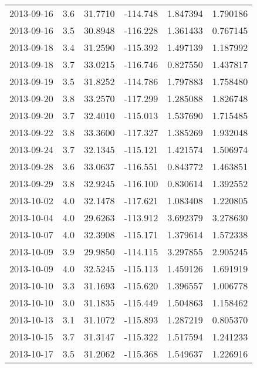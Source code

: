 \begin{tabular}{lrrrrr}
2013-09-16 &       3.6 &  31.7710 &  -114.748 &         1.847394 &         1.790186 \\
2013-09-16 &       3.5 &  30.8948 &  -116.228 &         1.361433 &         0.767145 \\
2013-09-18 &       3.4 &  31.2590 &  -115.392 &         1.497139 &         1.187992 \\
2013-09-18 &       3.7 &  33.0215 &  -116.746 &         0.827550 &         1.437817 \\
2013-09-19 &       3.5 &  31.8252 &  -114.786 &         1.797883 &         1.758480 \\
2013-09-20 &       3.8 &  33.2570 &  -117.299 &         1.285088 &         1.826748 \\
2013-09-20 &       3.7 &  32.4010 &  -115.013 &         1.537690 &         1.715485 \\
2013-09-22 &       3.8 &  33.3600 &  -117.327 &         1.385269 &         1.932048 \\
2013-09-24 &       3.7 &  32.1345 &  -115.121 &         1.421574 &         1.506974 \\
2013-09-28 &       3.6 &  33.0637 &  -116.551 &         0.843772 &         1.463851 \\
2013-09-29 &       3.8 &  32.9245 &  -116.100 &         0.830614 &         1.392552 \\
2013-10-02 &       4.0 &  32.1478 &  -117.621 &         1.083408 &         1.220805 \\
2013-10-04 &       4.0 &  29.6263 &  -113.912 &         3.692379 &         3.278630 \\
2013-10-07 &       4.0 &  32.3908 &  -115.171 &         1.379614 &         1.572338 \\
2013-10-09 &       3.9 &  29.9850 &  -114.115 &         3.297855 &         2.905245 \\
2013-10-09 &       4.0 &  32.5245 &  -115.113 &         1.459126 &         1.691919 \\
2013-10-10 &       3.3 &  31.1693 &  -115.620 &         1.396557 &         1.006778 \\
2013-10-10 &       3.0 &  31.1835 &  -115.449 &         1.504863 &         1.158462 \\
2013-10-13 &       3.1 &  31.1072 &  -115.893 &         1.287219 &         0.805370 \\
2013-10-15 &       3.7 &  31.3147 &  -115.322 &         1.517594 &         1.241233 \\
2013-10-17 &       3.5 &  31.2062 &  -115.368 &         1.549637 &         1.226916 \\

\end{tabular}
